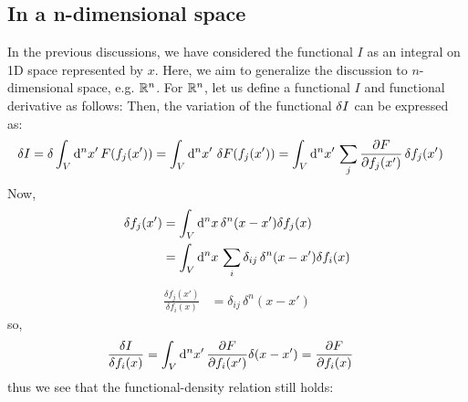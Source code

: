 \subsection{In a n-dimensional space}
In the previous discussions, we have considered the functional $I$ as an integral on 1D space represented by $x$.
Here, we aim to generalize the discussion to $n$-dimensional space, e.g. $\mathbb{R}^n$.
For $\mathbb{R}^n$, let us define a functional $I$ and functional derivative as follows:
Then, the variation of the functional $\fdif{I}$ can be expressed as:
\begin{align}
  \fdif{I} = \delta \int_V \odif[n]{x'} \, F(f_j(x'))
   & = \int_V \odif[n]{x'} \, \fdif{F}(f_j(x'))
  = \int_V \odif[n]{x'} \, \sum_j \pdv{F}{f_j(x')} \fdif{f_j}(x')
\end{align}
Now,
\begin{align}
  \delta f_j(x') & = \int_V \odif[n]{x} \, \delta^n(x - x')\delta f_j(x)                         \\
                 & = \int_V \odif[n]{x} \,  \sum_i \delta_{ij} \, \delta^n(x - x') \delta f_i(x)
\end{align}
\begin{align}
  \frac{\delta f_j(x')}{\delta f_i(x)} & = \delta_{ij} \, \delta^n(x - x')
\end{align}
so,
\begin{align}
  \fdv{I}{f_i(x)} & = \int_V \odif[n]{x'} \, \pdv{F}{f_i (x')} \delta(x - x') = \pdv{F}{f_i(x)}
\end{align}
thus we see that the functional-density relation still holds:

\cite{eman-functionalDerivative}